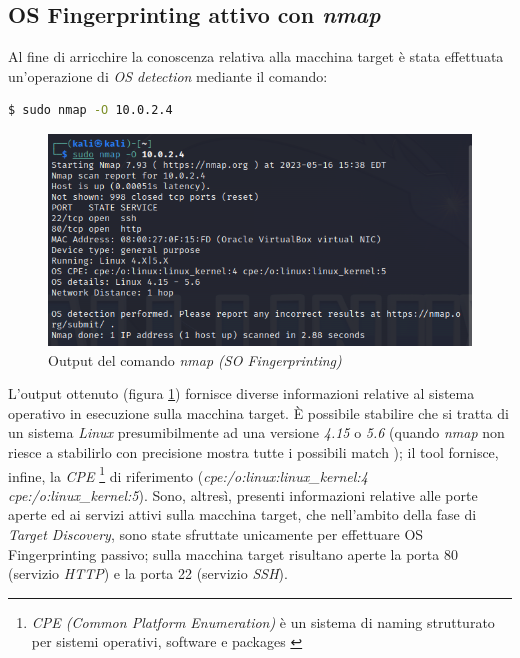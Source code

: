 \subsection{OS Fingerprinting attivo con \emph{nmap}}
Al fine di arricchire la conoscenza relativa alla macchina target è stata effettuata un'operazione di \emph{OS detection} mediante il comando:
\begin{lstlisting}[language=bash]
    $ sudo nmap -O 10.0.2.4
\end{lstlisting}
\begin{figure}
    \centering
    \includegraphics[scale=0.75]{capitoli/images/fingerprinting.png}
    \caption{Output del comando \emph{nmap (SO Fingerprinting)}}
    \label{fig:fingerprinting}
\end{figure}
L'output ottenuto (figura \ref{fig:fingerprinting}) fornisce diverse informazioni relative al sistema operativo in esecuzione sulla macchina target. È possibile stabilire che si tratta di un sistema \emph{Linux} presumibilmente ad una versione \emph{4.15} o \emph{5.6} (quando \emph{nmap} non riesce a stabilirlo con precisione mostra tutte i possibili match \cite{nmap-manual}); il tool fornisce, infine, la \emph{CPE} \footnote{\emph{CPE (Common Platform Enumeration)} è un sistema di naming strutturato per sistemi operativi, software e packages \cite{cpe}} di riferimento (\emph{cpe:/o:linux:linux\_kernel:4 cpe:/o:linux\_kernel:5}). Sono, altresì, presenti informazioni relative alle porte aperte ed ai servizi attivi sulla macchina target, che nell'ambito della fase di \emph{Target Discovery}, sono state sfruttate unicamente per effettuare OS Fingerprinting passivo; sulla macchina target risultano aperte la porta 80 (servizio \emph{HTTP}) e la porta 22 (servizio \emph{SSH}).
